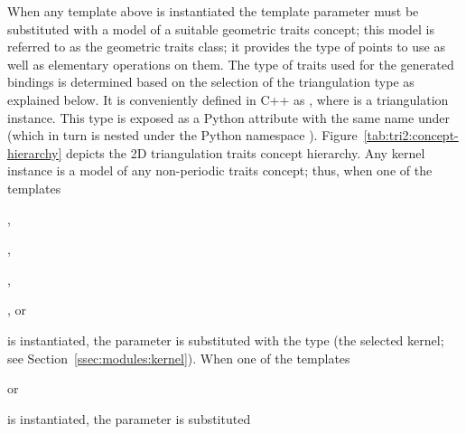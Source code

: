 When any template above is instantiated the template parameter
 must be substituted with a model of a suitable
geometric traits concept; this model is referred to as the geometric
traits class; it provides the type of points to use as well as
elementary operations on them. The type of traits used for the
generated bindings is determined based on the selection of the
triangulation type as explained below. It is conveniently defined in
C++ as , where  is a
triangulation instance. This type is exposed as a Python attribute
with the same name under  (which in turn
is nested under the Python namespace ).
Figure~\ref{tab:tri2:concept-hierarchy} depicts the 2D triangulation
traits concept hierarchy. Any kernel instance is a model of any
non-periodic traits concept; thus, when one of the templates
\begin{compactenum}
\item {},
\item {},
\item {},
\item {}, or
\item {}
\end{compactenum}
is instantiated, the  parameter is substituted
with the  type (the selected kernel; see
Section~\ref{ssec:modules:kernel}). When one of the templates
\begin{compactenum}
\item {} or
\item {}
\end{compactenum}
is instantiated, the  parameter is substituted
